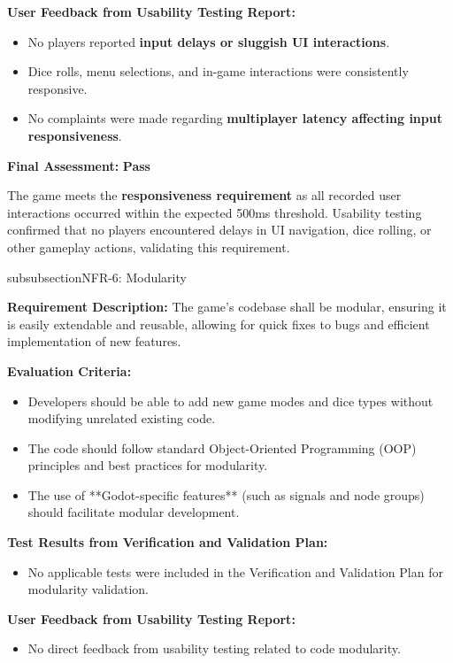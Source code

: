 \documentclass[12pt, titlepage]{article}
\begin{document}
\textbf{User Feedback from Usability Testing Report:}  
\begin{itemize}
    \item No players reported \textbf{input delays or sluggish UI interactions}.
    \item Dice rolls, menu selections, and in-game interactions were consistently responsive.
    \item No complaints were made regarding \textbf{multiplayer latency affecting input responsiveness}.
\end{itemize}

\textbf{Final Assessment:} \textbf{Pass}  

The game meets the \textbf{responsiveness requirement} as all recorded user interactions occurred within the expected 500ms threshold. Usability testing confirmed that no players encountered delays in UI navigation, dice rolling, or other gameplay actions, validating this requirement.


\*subsubsection{NFR-6: Modularity}

\textbf{Requirement Description:}  
The game’s codebase shall be modular, ensuring it is easily extendable and reusable, allowing for quick fixes to bugs and efficient implementation of new features.

\textbf{Evaluation Criteria:}  
\begin{itemize}
    \item Developers should be able to add new game modes and dice types without modifying unrelated existing code.
    \item The code should follow standard Object-Oriented Programming (OOP) principles and best practices for modularity.
    \item The use of **Godot-specific features** (such as signals and node groups) should facilitate modular development.
\end{itemize}

\textbf{Test Results from Verification and Validation Plan:}  
\begin{itemize}
    \item No applicable tests were included in the Verification and Validation Plan for modularity validation.
\end{itemize}

\textbf{User Feedback from Usability Testing Report:}  
\begin{itemize}
    \item No direct feedback from usability testing related to code modularity.
\end{itemize}
\end{document}
